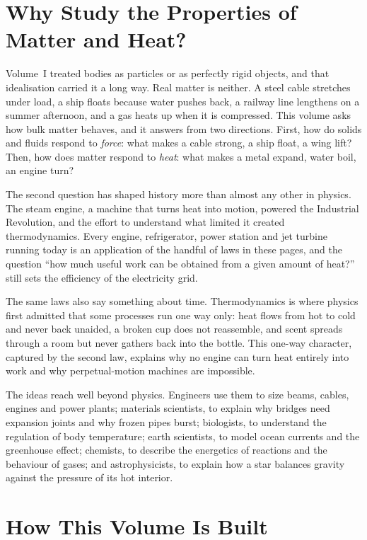 
\section*{Why Study the Properties of Matter and Heat?}

Volume~I treated bodies as particles or as perfectly rigid objects, and that idealisation carried it a
long way. Real matter is neither. A steel cable stretches under load, a ship floats because water pushes
back, a railway line lengthens on a summer afternoon, and a gas heats up when it is compressed. This
volume asks how bulk matter behaves, and it answers from two directions. First, how do solids and fluids
respond to \emph{force}: what makes a cable strong, a ship float, a wing lift? Then, how does matter
respond to \emph{heat}: what makes a metal expand, water boil, an engine turn?

The second question has shaped history more than almost any other in physics. The steam engine, a
machine that turns heat into motion, powered the Industrial Revolution, and the effort to understand what
limited it created thermodynamics. Every engine, refrigerator, power station and jet turbine running today
is an application of the handful of laws in these pages, and the question ``how much useful work can be
obtained from a given amount of heat?'' still sets the efficiency of the electricity grid.

The same laws also say something about time. Thermodynamics is where physics first admitted that some
processes run one way only: heat flows from hot to cold and never back unaided, a broken cup does not
reassemble, and scent spreads through a room but never gathers back into the bottle. This one-way
character, captured by the second law, explains why no engine can turn heat entirely into work and why
perpetual-motion machines are impossible.

The ideas reach well beyond physics. Engineers use them to size beams, cables, engines and power plants;
materials scientists, to explain why bridges need expansion joints and why frozen pipes burst; biologists,
to understand the regulation of body temperature; earth scientists, to model ocean currents and the
greenhouse effect; chemists, to describe the energetics of reactions and the behaviour of gases; and
astrophysicists, to explain how a star balances gravity against the pressure of its hot interior.

\section*{How This Volume Is Built}

